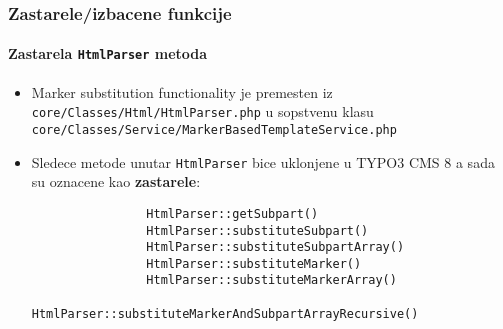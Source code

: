 
\begin{frame}[fragile]
	\frametitle{Zastarele/izbacene funkcije}
	\framesubtitle{Zastarela \texttt{HtmlParser} metoda}


	\begin{itemize}

		\item Marker substitution functionality je premesten iz \newline
			\texttt{core/Classes/Html/HtmlParser.php}\newline
			u sopstvenu klasu\newline
			\texttt{core/Classes/Service/MarkerBasedTemplateService.php}

		\item Sledece metode unutar \texttt{HtmlParser} bice uklonjene u TYPO3 CMS 8 a sada su oznacene kao \textbf{zastarele}:

			\begin{lstlisting}
				HtmlParser::getSubpart()
				HtmlParser::substituteSubpart()
				HtmlParser::substituteSubpartArray()
				HtmlParser::substituteMarker()
				HtmlParser::substituteMarkerArray()
				HtmlParser::substituteMarkerAndSubpartArrayRecursive()
			\end{lstlisting}

	\end{itemize}

\end{frame}



